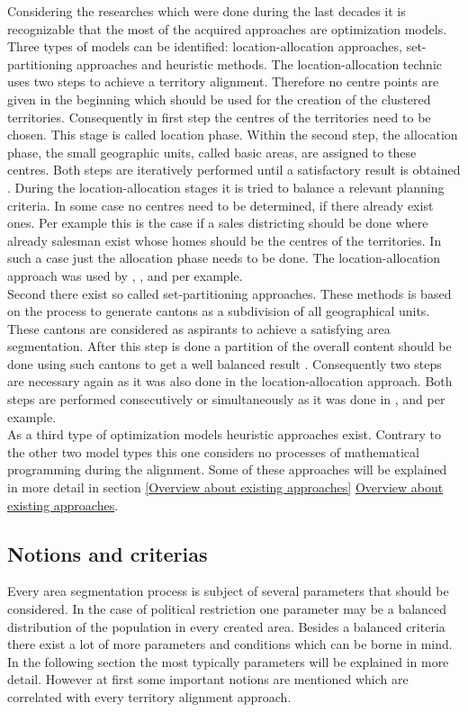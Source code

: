 Considering the researches which were done during the last decades it is recognizable that the most of the acquired approaches are optimization models. Three types of models can be identified: location-allocation approaches, set-partitioning approaches and heuristic methods. The location-allocation technic uses two steps to achieve a territory alignment. Therefore no centre points are given in the beginning which should be used for the creation of the clustered territories. Consequently in first step the centres of the territories need to be chosen. This stage is called location phase. Within the second step, the allocation phase, the small geographic units, called basic areas, are assigned to these centres. Both steps are iteratively performed until a satisfactory result is obtained \cite{kalcsics}. During the location-allocation stages it is tried to balance a relevant planning criteria. In some case no centres need to be determined, if there already exist ones. Per example this is the case if a sales districting should be done where already salesman exist whose homes should be the centres of the territories. In such a case just the allocation phase needs to be done. The location-allocation approach was used by \citeauthor{hessstuart}\cite{hessstuart}, \citeauthor{zoltner}\cite{zoltner},\citeauthor{george}\cite{george} and \citeauthor{schroeder}\cite{schroeder} per example.\\
Second there exist so called set-partitioning approaches. These methods is based on the process to generate cantons as a subdivision of all geographical units. These cantons are considered as aspirants to achieve a satisfying area segmentation. After this step is done a partition of the overall content should be done using such cantons to get a well balanced result \cite{schroeder}. Consequently two steps are necessary again as it was also done in the location-allocation approach. Both steps are performed consecutively or simultaneously as it was done in \citeauthor{garfinkel}\cite{garfinkel}, \citeauthor{nygreen}\cite{nygreen} and \citeauthor{mehrotra}\cite{mehrotra} per example. \\
As a third type of optimization models heuristic approaches exist. Contrary to the other two model types this one considers no processes of mathematical programming during the alignment. Some of these approaches will be explained in more detail in section \ref{Overview about existing approaches} \hyperref[Overview about existing approaches]{Overview about existing approaches}.


\subsection{Notions and criterias}
Every area segmentation process is subject of several parameters that should be considered. In the case of political restriction one parameter may be a balanced distribution of the population in every created area. Besides a balanced criteria there exist a lot of more parameters and conditions which can be borne in mind. In the following section the most typically parameters will be explained in more detail. However at first some important notions are mentioned which are correlated with every territory alignment approach.

